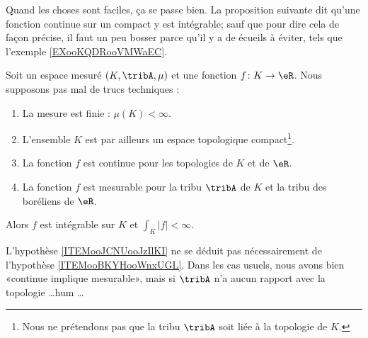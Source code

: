 Quand les choses sont faciles, ça se passe bien. La proposition suivante dit qu'une fonction continue sur un compact y est intégrable; sauf que pour dire cela de façon précise, il faut un peu bosser parce qu'il y a de écueils à éviter, tels que l'exemple \ref{EXooKQDRooVMWaEC}.
\begin{proposition}      \label{PROPooKFRSooANzglT}
	Soit un espace mesuré \( (K,\tribA, \mu)\) et une fonction \( f\colon K\to \eR\). Nous supposons pas mal de trucs techniques :
	\begin{enumerate}
		\item
		      La mesure est finie : \( \mu(K)<\infty\).
		\item
		      L'ensemble \( K\) est par ailleurs un espace topologique compact\footnote{Nous ne prétendons pas que la tribu \( \tribA\) soit liée à la topologie de \( K\).}.
		\item   \label{ITEMooBKYHooWnxUGL}
		      La fonction \( f\) est continue pour les topologies de \( K\) et de \( \eR\).
		\item   \label{ITEMooJCNUooJzIlKI}
		      La fonction \( f\) est mesurable pour la tribu \( \tribA\) de \( K\) et la tribu des boréliens de \( \eR\).
	\end{enumerate}
	Alors \( f\) est intégrable sur \( K\) et \( \int_K| f |<\infty\).
\end{proposition}

L'hypothèse \ref{ITEMooJCNUooJzIlKI} ne se déduit pas nécessairement de l'hypothèse \ref{ITEMooBKYHooWnxUGL}. Dans les cas usuels, nous avons bien «continue implique mesurable», mais si \( \tribA\) n'a aucun rapport avec la topologie \ldots hum \ldots

